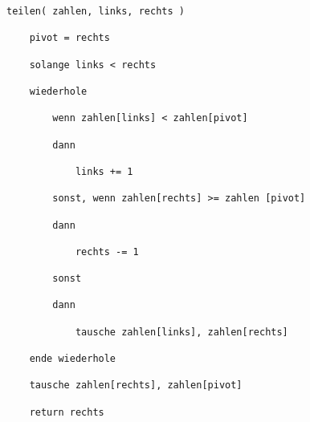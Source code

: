 \documentclass[13pt, a4paper, ngerman]{arbeitsblatt}
\begin{document}
\begin{lstlisting}[numbers=none,frame=none,backgroundcolor=\color{white}]
teilen( zahlen, links, rechts )

	pivot = rechts

	solange links < rechts

	wiederhole

		wenn zahlen[links] < zahlen[pivot]

		dann

			links += 1

		sonst, wenn zahlen[rechts] >= zahlen [pivot]

		dann

			rechts -= 1

		sonst

		dann

			tausche zahlen[links], zahlen[rechts]

	ende wiederhole

	tausche zahlen[rechts], zahlen[pivot]

	return rechts
\end{lstlisting}
\end{document}
